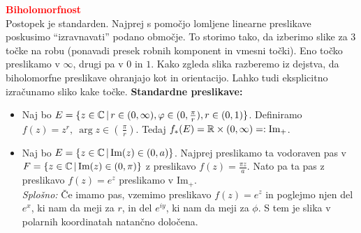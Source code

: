 \documentclass[a4paper,oneside,8pt,landscape]{extarticle}
\begin{document}
\begin{multicols*}{3}
%
%
\textbf{\textcolor{red}{Biholomorfnost}}\\
Postopek je standarden. Najprej s pomočjo lomljene linearne preslikave poskusimo "`izravnavati"' podano območje. To storimo tako, da izberimo slike za \(3\) točke na robu (ponavadi presek robnih komponent in vmesni točki). Eno točko preslikamo  v \(\infty\), drugi pa v \(0\) in \(1\). Kako zgleda slika razberemo iz dejstva, da biholomorfne preslikave ohranjajo kot in orientacijo. Lahko tudi eksplicitno izračunamo sliko kake točke.
\textbf{Standardne preslikave:}
\begin{itemize}
    \item Naj bo \(E = \{z \in \mathbb{C} \,|\, r \in (0, \infty), \varphi \in (0, \frac{\pi}{r}), r \in (0 ,1)\}\). Definiramo \(f(z) = z^r,\ \arg z \in (\, \frac{\pi}{r})\). Tedaj \(f_{*}(E) = \mathbb{R} \times (0, \infty) =: \text{Im}_+\).
    \item Naj bo \(E = \{z \in \mathbb{C} \,|\, \text{Im}(z) \in (0, a)\}\). Najprej preslikamo ta vodoraven pas v \(F = \{z \in \mathbb{C} \,|\, \text{Im}(z) \in (0, \pi)\} \) z preslikavo \(f(z) = \frac{\pi z}{a}\). Nato pa ta pas z preslikavo \(f(z) = e^z\) preslikamo v \(\text{Im}_+\).\\ 
    \emph{Splošno:} Če imamo pas, vzemimo preslikavo \(f(z) = e^z\) in poglejmo njen del \(e^x\), ki nam da meji za \(r\), in del \(e^{iy}\), ki nam da meji za \(\phi\). S tem je slika v polarnih koordinatah natančno določena.


\end{itemize}
\end{multicols*}
\end{document}
